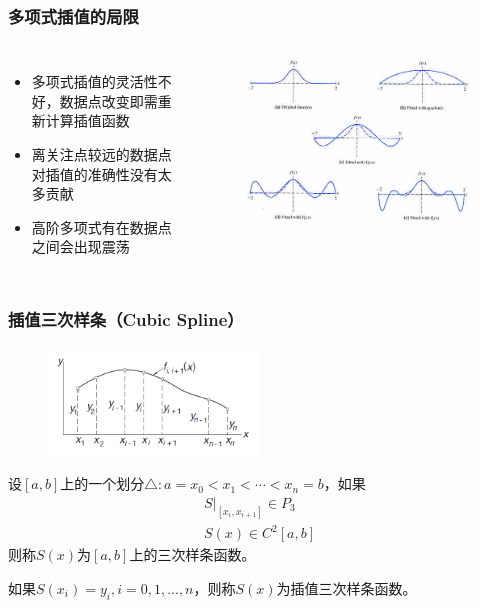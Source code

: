 \documentclass[red,compress]{beamer}
\begin{document}
\begin{frame}
\frametitle{多项式插值的局限}
\begin{columns}[T]
\begin{itemize}
\item 多项式插值的灵活性不好，数据点改变即需重新计算插值函数
\item 离关注点较远的数据点对插值的准确性没有太多贡献
\item 高阶多项式有在数据点之间会出现震荡
\end{itemize}

\begin{figure}
\center
\includegraphics[width=\textwidth]{poly-int2.png}
\end{figure}
\end{columns}

\end{frame}
\begin{frame}
\frametitle{插值三次样条（Cubic Spline）}

\begin{figure}
\center
\includegraphics[width=0.5\textwidth]{cubic-int.png}
\end{figure}

设$[a,b]$上的一个划分$\triangle:a=x_0<x_1<\cdots<x_n=b$，如果
\begin{gather*}
	S|_{[x_i,x_{i+1}]}\in P_3 \\
	S(x) \in C^2[a,b]
\end{gather*}
则称$S(x)$为$[a,b]$上的三次样条函数。

如果$S(x_i)=y_i,i=0,1,...,n$，则称$S(x)$为插值三次样条函数。
\end{frame}
\end{document}
